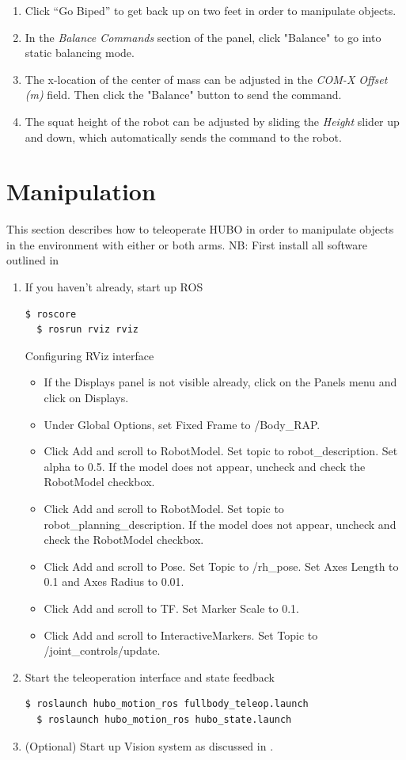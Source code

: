 \documentclass[letterpaper, 10 pt]{report}
\begin{document}
\begin{enumerate}
    \item Click ``Go Biped'' to get back up on two feet in order to manipulate objects.
    \item In the \textit{Balance Commands} section of the panel, click "Balance" to go into static balancing mode.
    \item The x-location of the center of mass can be adjusted in the \textit{COM-X Offset (m)} field. Then click the "Balance" button to send the command.
    \item The squat height of the robot can be adjusted by sliding the \textit{Height} slider up and down, which automatically sends the command to the robot.
  \end{enumerate}
  
\pagebreak
\section{Manipulation}
This section describes how to teleoperate HUBO in order to manipulate objects in the environment with either or both arms.
NB: First install all software outlined in 
\begin{enumerate}
  \item If you haven't already, start up ROS
  \begin{lstlisting}[language=bash]
  $ roscore
  $ rosrun rviz rviz
  \end{lstlisting}
  Configuring RViz interface
  \begin{itemize}
    \item If the Displays panel is not visible already, click on the Panels menu and click on Displays.
    \item Under Global Options, set Fixed Frame to /Body\_RAP.
    \item Click Add and scroll to RobotModel. Set topic to robot\_description. Set alpha to 0.5. If the model does not appear, uncheck and check the RobotModel checkbox.
    \item Click Add and scroll to RobotModel. Set topic to robot\_planning\_description. If the model does not appear, uncheck and check the RobotModel checkbox.
    \item Click Add and scroll to Pose. Set Topic to /rh\_pose. Set Axes Length to 0.1 and Axes Radius to 0.01.
    \item Click Add and scroll to TF. Set Marker Scale to 0.1.
    \item Click Add and scroll to InteractiveMarkers. Set Topic to /joint\_controls/update.
  \end{itemize}
  \item Start the teleoperation interface and state feedback
  \begin{lstlisting}[language=bash]
  $ roslaunch hubo_motion_ros fullbody_teleop.launch
  $ roslaunch hubo_motion_ros hubo_state.launch
  \end{lstlisting}
  \item (Optional) Start up Vision system as discussed in .
\end{enumerate}
\end{document}
